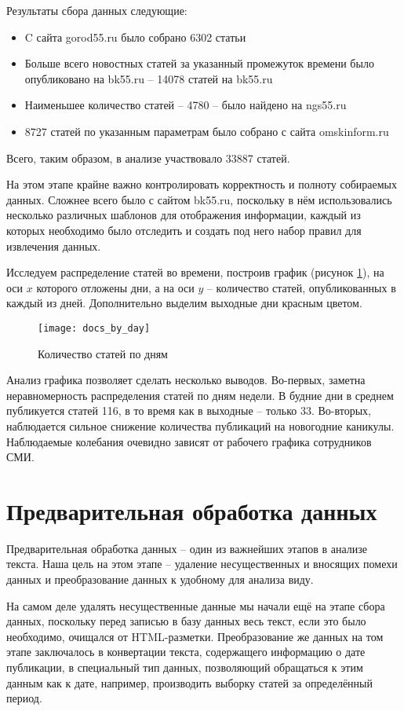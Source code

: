 Результаты сбора данных следующие:
\begin{itemize}
\item C сайта gorod55.ru было собрано 6302 статьи
\item Больше всего новостных статей за указанный промежуток времени было опубликовано на bk55.ru -- 14078 статей  на bk55.ru
\item Наименьшее количество статей -- 4780 -- было найдено на ngs55.ru
\item 8727 статей по указанным параметрам было собрано с сайта omskinform.ru
\end{itemize}

Всего, таким образом, в анализе участвовало 33887 статей.

На этом этапе крайне важно контролировать корректность и полноту собираемых данных. Сложнее всего было с сайтом bk55.ru, поскольку в нём использовались несколько различных шаблонов для отображения информации, каждый из которых необходимо было отследить и создать под него набор правил для извлечения данных.

Исследуем распределение статей во времени, построив график (рисунок \ref{fig:docs_by_day}), на оси $x$ которого отложены дни, а на оси $y$ -- количество статей, опубликованных в каждый из дней. Дополнительно выделим выходные дни красным цветом.

\begin{figure}
	\centering
    \texttt{[image: docs\_by\_day]}
    \caption{Количество статей по дням}
    \label{fig:docs_by_day}
\end{figure}

Анализ графика позволяет сделать несколько выводов. Во-первых, заметна неравномерность распределения статей по дням недели. В будние дни в среднем публикуется статей 116, в то время как в выходные -- только 33. Во-вторых, наблюдается сильное снижение количества публикаций на новогодние каникулы. Наблюдаемые колебания очевидно зависят от рабочего графика сотрудников СМИ.

\section{Предварительная обработка данных}

Предварительная обработка данных -- один из важнейших этапов в анализе текста. Наша цель на этом этапе -- удаление несущественных и вносящих помехи данных и преобразование данных к удобному для анализа виду.

На самом деле удалять несущественные данные мы начали ещё на этапе сбора данных, поскольку перед записью в базу данных весь текст, если это было необходимо, очищался от HTML-разметки. Преобразование же данных на том этапе заключалось в конвертации текста, содержащего информацию о дате публикации, в специальный тип данных, позволяющий обращаться к этим данным как к дате, например, производить выборку статей за определённый период.

